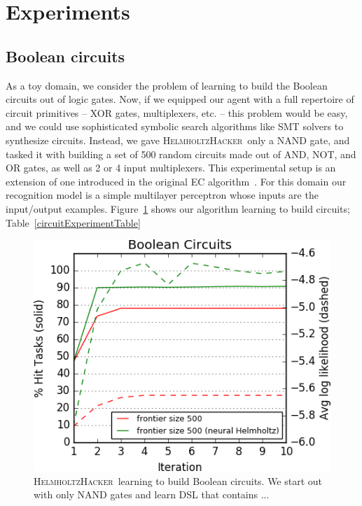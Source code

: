 \documentclass{article}
\newcommand{\system}{\textsc{HelmholtzHacker}~}
\begin{document}
\section{Experiments}

\subsection{Boolean circuits}
As a toy domain, we consider the problem of learning
to build the Boolean circuits out of logic gates.
Now, if we equipped our agent with a full repertoire of
circuit primitives -- XOR gates, multiplexers, etc. -- this problem would be easy,
and we could use sophisticated symbolic search algorithms like SMT solvers to synthesize circuits.
Instead, we gave \system only a NAND gate,
and tasked it with building a set of 500 random circuits made out of
AND, NOT, and OR gates,
as well as 2 or 4 input multiplexers.
This experimental setup is an extension of one introduced in the original EC algorithm~\cite{Dechter:2013:BLV:2540128.2540316}.
For this domain our recognition model is a simple multilayer perceptron
whose inputs are the input/output examples.
Figure~\ref{circuitLearningCurve} shows our algorithm learning to build circuits; Table~\ref{circuitExperimentTable} 


\begin{figure}
  \includegraphics[width = \columnwidth]{figures/circuit.png}
  \caption{\system learning to build Boolean circuits. We start out with only NAND gates and learn DSL that contains ...}\label{circuitLearningCurve}
\end{figure}
\end{document}
